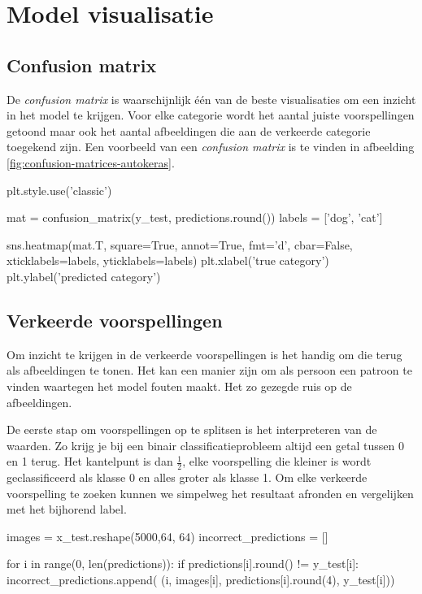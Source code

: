 \section{Model visualisatie}
\label{sec:vis-autokeras}

\subsection{Confusion matrix}
\label{subsec:confusion-autokeras}

De \textit{confusion matrix} is waarschijnlijk één van de beste visualisaties om een inzicht in het model te krijgen. Voor elke categorie wordt het aantal juiste voorspellingen getoond maar ook het aantal afbeeldingen die aan de verkeerde categorie toegekend zijn. Een voorbeeld van een \textit{confusion matrix} is te vinden in afbeelding \ref{fig:confusion-matrices-autokeras}.

\bigskip

\begin{python}
plt.style.use('classic')

mat = confusion_matrix(y_test, predictions.round())
labels = ['dog', 'cat']

sns.heatmap(mat.T, square=True, annot=True, fmt='d', cbar=False, xticklabels=labels, yticklabels=labels)
plt.xlabel('true category')
plt.ylabel('predicted category')
\end{python} 


\subsection{Verkeerde voorspellingen}
\label{subsec:wrong-predictions}

Om inzicht te krijgen in de verkeerde voorspellingen is het handig om die terug als afbeeldingen te tonen. Het kan een manier zijn om als persoon een patroon te vinden waartegen het model fouten maakt. Het zo gezegde ruis op de afbeeldingen. 

De eerste stap om voorspellingen op te splitsen is het interpreteren van de waarden. Zo krijg je bij een binair classificatieprobleem altijd een getal tussen 0 en 1 terug. Het kantelpunt is dan $\frac{1}{2}$, elke voorspelling die kleiner is wordt geclassificeerd als klasse 0 en alles groter als klasse 1. Om elke verkeerde voorspelling te zoeken kunnen we simpelweg het resultaat afronden en vergelijken met het bijhorend label.

\bigskip

\begin{python}
images = x_test.reshape(5000,64, 64)
incorrect_predictions = []

for i in range(0, len(predictions)):
    if predictions[i].round() != y_test[i]:
        incorrect_predictions.append(
            (i, images[i], predictions[i].round(4), y_test[i]))
\end{python}

